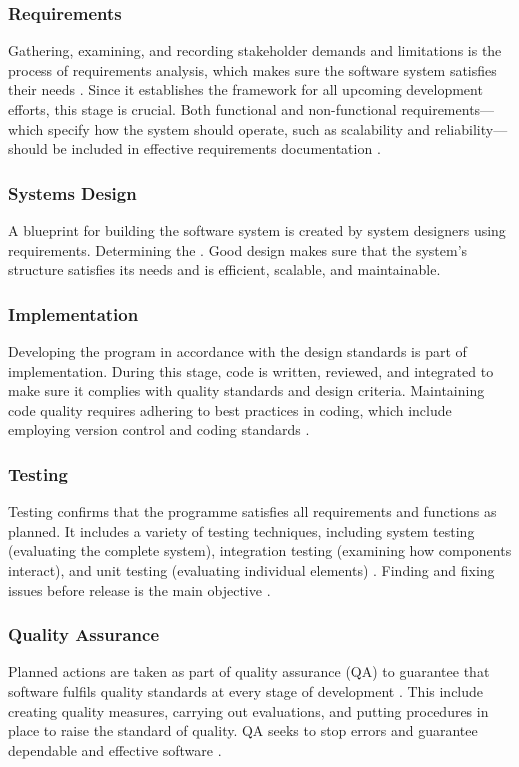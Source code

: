 \subsubsection{Requirements}
\par{Gathering, examining, and recording stakeholder demands and limitations is the process of requirements analysis, which makes sure the software system satisfies their needs \citep{doe2011recommended}. Since it establishes the framework for all upcoming development efforts, this stage is crucial. Both functional and non-functional requirements—which specify how the system should operate, such as scalability and reliability—should be included in effective requirements documentation \citep{sommerville2011software}.}
\subsubsection{Systems Design}
\par{A blueprint for building the software system is created by system designers using requirements. Determining the \citep{jacobson2021unified}. Good design makes sure that the system's structure satisfies its needs and is efficient, scalable, and maintainable.}
\subsubsection{Implementation}
\par{Developing the program in accordance with the design standards is part of implementation. During this stage, code is written, reviewed, and integrated to make sure it complies with quality standards and design criteria. Maintaining code quality requires adhering to best practices in coding, which include employing version control and coding standards \cite{mcconnell2004code}.}
\subsubsection{Testing}
\par{Testing confirms that the programme satisfies all requirements and functions as planned. It includes a variety of testing techniques, including system testing (evaluating the complete system), integration testing (examining how components interact), and unit testing (evaluating individual elements) \citep{istqb2011foundation}. Finding and fixing issues before release is the main objective \citep{myers2011art}.}
\subsubsection{Quality Assurance}
\par{Planned actions are taken as part of quality assurance (QA) to guarantee that software fulfils quality standards at every stage of development \citep{team2002capability}. This include creating quality measures, carrying out evaluations, and putting procedures in place to raise the standard of quality. QA seeks to stop errors and guarantee dependable and effective software \citep{international2011systems}.}
